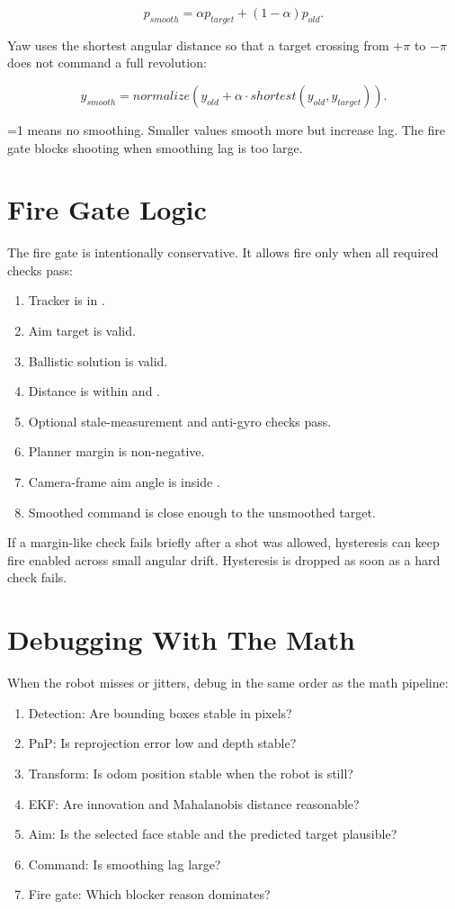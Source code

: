 \[
p_{smooth} = \alpha p_{target} + (1-\alpha)p_{old}.
\]

Yaw uses the shortest angular distance so that a target crossing from
$+\pi$ to $-\pi$ does not command a full revolution:

\[
y_{smooth} =
normalize(y_{old} + \alpha \cdot shortest(y_{old}, y_{target})).
\]

=1 means no smoothing. Smaller values smooth more but
increase lag. The fire gate blocks shooting when smoothing lag is too large.

\section{Fire Gate Logic}

The fire gate is intentionally conservative. It allows fire only when all
required checks pass:

\begin{enumerate}
  \item Tracker is in .
  \item Aim target is valid.
  \item Ballistic solution is valid.
  \item Distance is within  and .
  \item Optional stale-measurement and anti-gyro checks pass.
  \item Planner margin is non-negative.
  \item Camera-frame aim angle is inside .
  \item Smoothed command is close enough to the unsmoothed target.
\end{enumerate}

If a margin-like check fails briefly after a shot was allowed, hysteresis can
keep fire enabled across small angular drift. Hysteresis is dropped as soon as
a hard check fails.

\section{Debugging With The Math}

When the robot misses or jitters, debug in the same order as the math pipeline:

\begin{enumerate}
  \item Detection: Are bounding boxes stable in pixels?
  \item PnP: Is reprojection error low and depth stable?
  \item Transform: Is odom position stable when the robot is still?
  \item EKF: Are innovation and Mahalanobis distance reasonable?
  \item Aim: Is the selected face stable and the predicted target plausible?
  \item Command: Is smoothing lag large?
  \item Fire gate: Which blocker reason dominates?
\end{enumerate}


